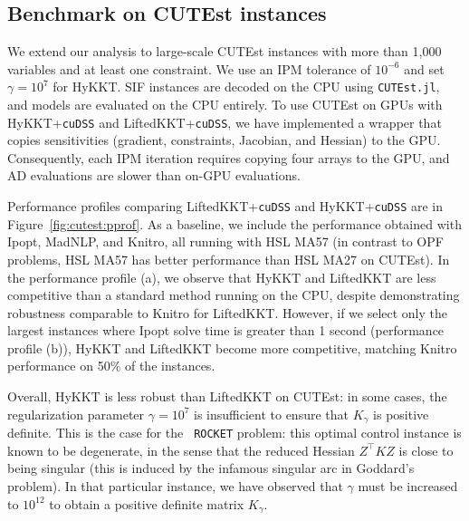 \documentclass[smallextended]{svjour3}
\newcommand{\add}[1]{#1}
\begin{document}
\subsection{Benchmark on CUTEst instances}
\label{sec:num:cutest}
We extend our analysis to large-scale CUTEst instances with more than 1,000 variables and at least one constraint. We use an IPM tolerance of $10^{-6}$ and set $\gamma = 10^7$ for HyKKT. SIF instances are decoded on the CPU using {\tt CUTEst.jl}, \add{and models are evaluated on the CPU entirely. To use CUTEst on GPUs with HyKKT+{\tt cuDSS} and LiftedKKT+{\tt cuDSS}, we have implemented a wrapper that copies sensitivities (gradient, constraints, Jacobian, and Hessian) to the GPU. Consequently, each IPM iteration requires copying four arrays to the GPU, and AD evaluations are slower than on-GPU evaluations.}

Performance profiles comparing LiftedKKT+{\tt cuDSS} and HyKKT+{\tt cuDSS} are
in Figure~\ref{fig:cutest:pprof}. As a baseline, we include the performance
obtained with Ipopt, MadNLP, and Knitro, all running with HSL MA57 (in
contrast to OPF problems, HSL MA57 has better performance than HSL MA27 on CUTEst).
In the performance profile (a), we observe that HyKKT and LiftedKKT are less
competitive than a standard method running on the CPU, despite demonstrating
robustness comparable to Knitro for LiftedKKT. However, if we select only the
largest instances where Ipopt solve time is greater than 1 second
(performance profile (b)), HyKKT and LiftedKKT become more competitive, matching
Knitro performance on 50\% of the instances.

%
Overall, HyKKT is less robust than LiftedKKT on CUTEst: in some cases, the
regularization parameter $\gamma = 10^7$ is insufficient to ensure that
$K_\gamma$ is positive definite. This is the case for the {\tt
ROCKET} problem: this optimal control instance is known to be degenerate, in the sense that
the reduced Hessian $Z^\top K Z$ is close to being singular (this is induced
by the infamous singular arc in Goddard's problem). In that particular instance, we have observed that
$\gamma$ must be increased to $10^{12}$ to obtain a positive definite matrix $K_\gamma$.
\end{document}
